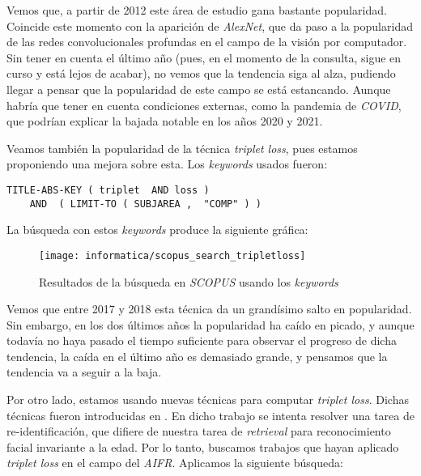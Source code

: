 Vemos que, a partir de 2012 este área de estudio gana bastante popularidad. Coincide este momento con la aparición de \textit{AlexNet}, que da paso a la popularidad de las redes convolucionales profundas en el campo de la visión por computador. Sin tener en cuenta el último año (pues, en el momento de la consulta, sigue en curso y está lejos de acabar), no vemos que la tendencia siga al alza, pudiendo llegar a pensar que la popularidad de este campo se está estancando. Aunque habría que tener en cuenta condiciones externas, como la pandemia de \textit{COVID}, que podrían explicar la bajada notable en los años 2020 y 2021.

Veamos también la popularidad de la técnica \textit{triplet loss}, pues estamos proponiendo una mejora sobre esta. Los \textit{keywords} usados fueron:

\begin{lstlisting}[caption=\textit{Keywords usados para la búsqueda en \textit{SCOPUS} para consultar la popularidad del \textit{triplet loss}. Búsqueda realizada el 17 de Septiembre de 2023}, label=code:scopus_search_tripletloss, captionpos=b]
    TITLE-ABS-KEY ( triplet  AND loss )
    AND  ( LIMIT-TO ( SUBJAREA ,  "COMP" ) )
\end{lstlisting}

La búsqueda con estos \textit{keywords} produce la siguiente gráfica:

\begin{figure}[H]
    \centering
    \texttt{[image: informatica/scopus\_search\_tripletloss]}
    \caption{Resultados de la búsqueda en \textit{SCOPUS} usando los \textit{keywords} }
\end{figure}

Vemos que entre 2017 y 2018 esta técnica da un grandísimo salto en popularidad. Sin embargo, en los dos últimos años la popularidad ha caído en picado, y aunque todavía no haya pasado el tiempo suficiente para observar el progreso de dicha tendencia, la caída en el último año es demasiado grande, y pensamos que la tendencia va a seguir a la baja.

Por otro lado, estamos usando nuevas técnicas para computar \textit{triplet loss}. Dichas técnicas fueron introducidas en \cite{informatica:principal}. En dicho trabajo se intenta resolver una tarea de re-identificación, que difiere de nuestra tarea de \textit{retrieval} para reconocimiento facial invariante a la edad. Por lo tanto, buscamos trabajos que hayan aplicado \textit{triplet loss} en el campo del \textit{AIFR}. Aplicamos la siguiente búsqueda:

